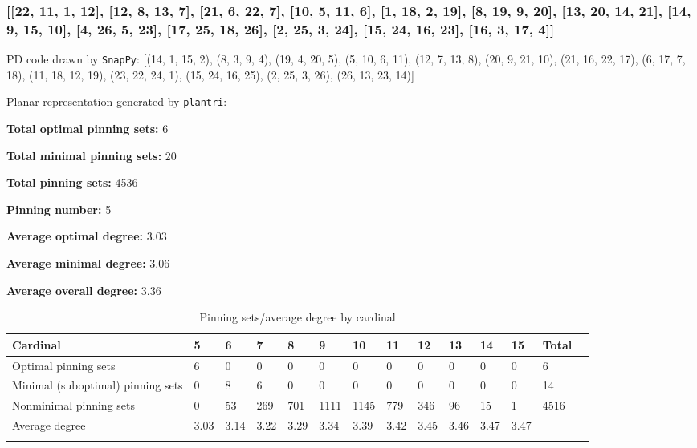 \documentclass{article}%
\begin{document}
\newpage

\subsubsection{[[22, 11, 1, 12], [12, 8, 13, 7], [21, 6, 22, 7], [10, 5, 11, 6], [1, 18, 2, 19], [8, 19, 9, 20], [13, 20, 14, 21], [14, 9, 15, 10], [4, 26, 5, 23], [17, 25, 18, 26], [2, 25, 3, 24], [15, 24, 16, 23], [16, 3, 17, 4]]}

{\small\noindent PD code drawn by \texttt{SnapPy}: [(14, 1, 15, 2), (8, 3, 9, 4), (19, 4, 20, 5), (5, 10, 6, 11), (12, 7, 13, 8), (20, 9, 21, 10), (21, 16, 22, 17), (6, 17, 7, 18), (11, 18, 12, 19), (23, 22, 24, 1), (15, 24, 16, 25), (2, 25, 3, 26), (26, 13, 23, 14)]}

{\small\noindent Planar representation generated by \texttt{plantri}: -}

\begin{multicols}{2}
{\normalsize \noindent\textbf{Total optimal pinning sets:} 6

\noindent\textbf{Total minimal pinning sets:} 20

\noindent\textbf{Total pinning sets:} 4536

\noindent\textbf{Pinning number:} 5

}
\columnbreak

{\normalsize \noindent\textbf{Average optimal degree:} 3.03

\noindent\textbf{Average minimal degree:} 3.06

\noindent\textbf{Average overall degree:} 3.36

}
\end{multicols}

\begin{table}[ht]
	\caption{Pinning sets/average degree by cardinal}
	\centering
	\renewcommand{\arraystretch}{1.5}
	\begin{tabularx}{\textwidth}{lXXXXXXXXXXXXX}
		\toprule
			Cardinal & 5 & 6 & 7 & 8 & 9 & 10 & 11 & 12 & 13 & 14 & 15 & Total\\
			\hline
			Optimal pinning sets & 6 & 0 & 0 & 0 & 0 & 0 & 0 & 0 & 0 & 0 & 0 & 6 \\
			Minimal (suboptimal) pinning sets & 0 & 8 & 6 & 0 & 0 & 0 & 0 & 0 & 0 & 0 & 0 & 14 \\
			Nonminimal pinning sets & 0 & 53 & 269 & 701 & 1111 & 1145 & 779 & 346 & 96 & 15 & 1 & 4516 \\
			Average degree & 3.03 & 3.14 & 3.22 & 3.29 & 3.34 & 3.39 & 3.42 & 3.45 & 3.46 & 3.47 & 3.47 &  \\
		\bottomrule \\ 
	\end{tabularx}
\end{table}
\end{document}

